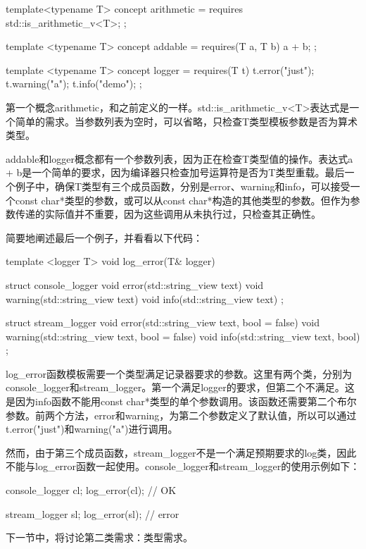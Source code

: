 \begin{cpp}
template<typename T>
concept arithmetic = requires
{
	std::is_arithmetic_v<T>;
};

template <typename T>
concept addable = requires(T a, T b)
{
	a + b;
};

template <typename T>
concept logger = requires(T t)
{
	t.error("just");
	t.warning("a");
	t.info("demo");
};
\end{cpp}

第一个概念arithmetic，和之前定义的一样。std::is\_arithmetic\_v<T>表达式是一个简单的需求。当参数列表为空时，可以省略，只检查T类型模板参数是否为算术类型。

addable和logger概念都有一个参数列表，因为正在检查T类型值的操作。表达式a + b是一个简单的要求，因为编译器只检查加号运算符是否为T类型重载。最后一个例子中，确保T类型有三个成员函数，分别是error、warning和info，可以接受一个const char*类型的参数，或可以从const char*构造的其他类型的参数。但作为参数传递的实际值并不重要，因为这些调用从未执行过，只检查其正确性。

简要地阐述最后一个例子，并看看以下代码：

\begin{cpp}
template <logger T>
void log_error(T& logger)
{}

struct console_logger
{
	void error(std::string_view text){}
	void warning(std::string_view text) {}
	void info(std::string_view text) {}
};

struct stream_logger
{
	void error(std::string_view text, bool = false) {}
	void warning(std::string_view text, bool = false) {}
	void info(std::string_view text, bool) {}
};
\end{cpp}

log\_error函数模板需要一个类型满足记录器要求的参数。这里有两个类，分别为console\_logger和stream\_logger。第一个满足logger的要求，但第二个不满足。这是因为info函数不能用const char*类型的单个参数调用。该函数还需要第二个布尔参数。前两个方法，error和warning，为第二个参数定义了默认值，所以可以通过t.error("just")和warning("a")进行调用。

然而，由于第三个成员函数，stream\_logger不是一个满足预期要求的log类，因此不能与log\_error函数一起使用。console\_logger和stream\_logger的使用示例如下：

\begin{cpp}
console_logger cl;
log_error(cl); // OK

stream_logger sl;
log_error(sl); // error
\end{cpp}

下一节中，将讨论第二类需求：类型需求。

